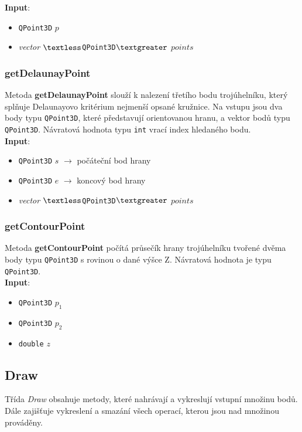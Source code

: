 \documentclass[a4paper, 12pt]{article}
\begin{document}
\textbf{Input}:
\begin{itemize}
\item \texttt{QPoint3D} $p$ 
\item \textsl{vector} $\textless$\texttt{QPoint3D}$\textgreater$ $points$
\end{itemize}

\subsubsection*{getDelaunayPoint}
Metoda \textbf{getDelaunayPoint} slouží k nalezení třetího bodu trojúhelníku, který splňuje Delaunayovo kritérium nejmenší opsané kružnice. Na vstupu jsou dva body typu \texttt{QPoint3D}, které představují orientovanou hranu, a vektor bodů typu \texttt{QPoint3D}. Návratová hodnota typu \texttt{int} vrací index hledaného bodu.\\

\textbf{Input}:
\begin{itemize}
\item \texttt{QPoint3D} $s$ $\rightarrow$ počáteční bod hrany
\item \texttt{QPoint3D} $e$ $\rightarrow$ koncový bod hrany
\item \textsl{vector} $\textless$\texttt{QPoint3D}$\textgreater$ $points$
\end{itemize}

\subsubsection*{getContourPoint}
Metoda \textbf{getContourPoint} počítá průsečík hrany trojúhelníku tvořené dvěma body typu \texttt{QPoint3D} s rovinou o dané výšce Z. Návratová hodnota je typu \texttt{QPoint3D}.\\

\textbf{Input}:
\begin{itemize}
\item \texttt{QPoint3D} $p_1$ 
\item \texttt{QPoint3D} $p_2$ 
\item \texttt{double} $z$ 
\end{itemize}

\subsection{Draw}
Třída \textit{Draw} obsahuje metody, které nahrávají a vykreslují vstupní množinu bodů. Dále zajišťuje vykreslení a smazání všech operací, kterou jsou nad množinou prováděny.
\end{document}
